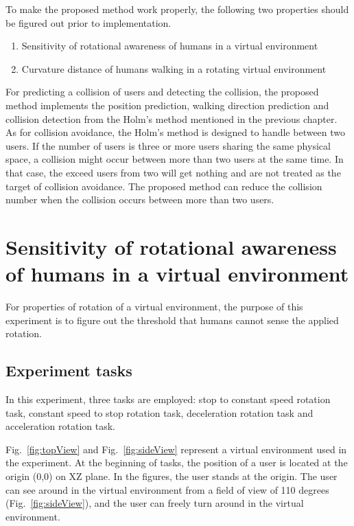 To make the proposed method work properly, the following two properties should be figured out prior to implementation.
\begin{enumerate}
  \item Sensitivity of rotational awareness of humans in a virtual environment
  \item Curvature distance of humans walking in a rotating virtual environment
\end{enumerate}

For predicting a collision of users and detecting the collision, the proposed method implements the position prediction, walking direction prediction and collision detection from the Holm's method mentioned in the previous chapter. As for collision avoidance, the Holm's method is designed to handle between two users. If the number of users is three or more users sharing the same physical space, a collision might occur between more than two users at the same time. In that case, the exceed users from two will get nothing and are not treated as the target of collision avoidance. The proposed method can reduce the collision number when the collision occurs between more than two users.






\newpage
\section{Sensitivity of rotational awareness of humans in a virtual environment}
For properties of rotation of a virtual environment, the purpose of this experiment is to figure out the threshold that humans cannot sense the applied rotation.


\subsection{Experiment tasks}
In this experiment, three tasks are employed: stop to constant speed rotation task, constant speed to stop rotation task, deceleration rotation task and acceleration rotation task. 

Fig.~\ref{fig:topView} and Fig.~\ref{fig:sideView} represent a virtual environment used in the experiment. At the beginning of tasks, the position of a user is located at the origin (0,0) on XZ plane. In the figures, the user stands at the origin. The user can see around in the virtual environment from a field of view of 110 degrees (Fig.~\ref{fig:sideView}), and the user can freely turn around in the virtual environment. 



